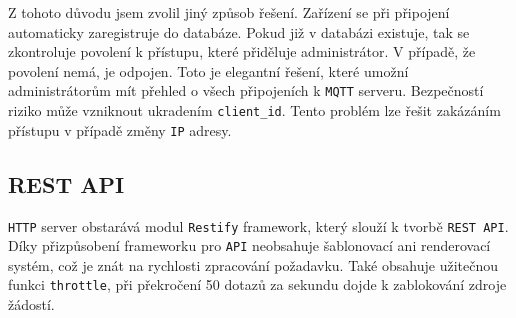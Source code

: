 \documentclass[czech,BP]{thesiskiv}
\begin{document}
 		Z tohoto důvodu jsem zvolil jiný způsob řešení.
		Zařízení se při připojení automaticky zaregistruje do databáze. Pokud již v databázi existuje, tak se zkontroluje povolení k přístupu, které přiděluje administrátor.
		V případě, že povolení nemá, je odpojen. Toto je elegantní řešení, které umožní administrátorům mít přehled o všech připojeních k \texttt{MQTT} serveru.			
		Bezpečností riziko může vzniknout ukradením \texttt{client\_id}. Tento problém lze řešit zakázáním přístupu v případě změny \texttt{IP} adresy.
		
		
		
		
	
		\subsection{REST API}
		\texttt{HTTP} server obstarává modul \texttt{Restify} framework, který slouží k tvorbě \texttt{REST API}. Díky přizpůsobení frameworku pro \texttt{API} neobsahuje šablonovací ani renderovací systém, což je znát na rychlosti zpracování požadavku.
		Také obsahuje užitečnou funkci \texttt{throttle}, při překročení 50 dotazů za sekundu dojde k zablokování zdroje žádostí.		
		
\end{document}
